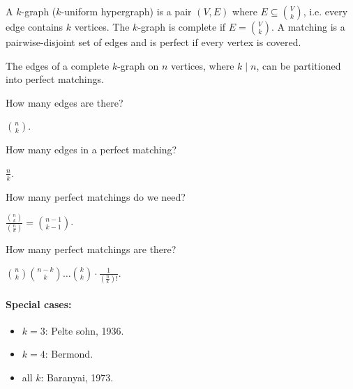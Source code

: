 \begin{definition}
    A \(k\)-graph (\(k\)-uniform hypergraph) is a pair \((V, E)\) where \(E \subseteq \binom{V}{k}\), i.e. every edge contains \(k\) vertices. The \(k\)-graph is complete if \(E = \binom{V}{k}\). A matching is a pairwise-disjoint set of edges and is perfect if every vertex is covered.       
\end{definition}

\begin{theorem}[Baranyai, 1973]
    The edges of a complete \(k\)-graph on \(n\) vertices, where \(k \mid n\), can be partitioned into perfect matchings.   
\end{theorem}

\begin{question}
    How many edges are there?
\end{question}
\begin{answer}
    \(\binom{n}{k}\). 
\end{answer}

\begin{question}
    How many edges in a perfect matching?
\end{question}
\begin{answer}
    \(\frac{n}{k}\). 
\end{answer}

\begin{question}
    How many perfect matchings do we need?
\end{question}
\begin{answer}
    \(\frac{\binom{n}{k}}{\left( \frac{n}{k} \right) } = \binom{n - 1}{k - 1}\). 
\end{answer}

\begin{question}
    How many perfect matchings are there?
\end{question}
\begin{answer}
    \(\binom{n}{k} \binom{n - k}{k} \dots \binom{k}{k} \cdot \frac{1}{\left( \frac{n}{k} \right)! }\). 
\end{answer}

\paragraph{Special cases:}
\begin{itemize}
    \item \(k = 3\): Pelte sohn, 1936. 
    \item \(k = 4\): Bermond. 
    \item all \(k\): Baranyai, 1973.   
\end{itemize}

